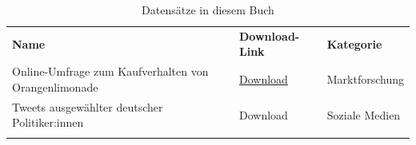 \documentclass[
]{book}
\begin{document}
\begin{longtable}[]{@{}
  >{\raggedright\arraybackslash}p{}
  >{\raggedright\arraybackslash}p{}
  >{\raggedright\arraybackslash}p{}@{}}
\caption{Datensätze in diesem Buch}\tabularnewline
\toprule
\endhead
\textbf{Name} & \textbf{Download-Link} & \textbf{Kategorie} \\
Online-Umfrage zum Kaufverhalten von Orangenlimonade & \href{datasets/limonade.csv}{Download} & Marktforschung \\
Tweets ausgewählter deutscher Politiker:innen & Download & Soziale Medien \\
& & \\
\bottomrule
\end{longtable}

  
\end{document}
